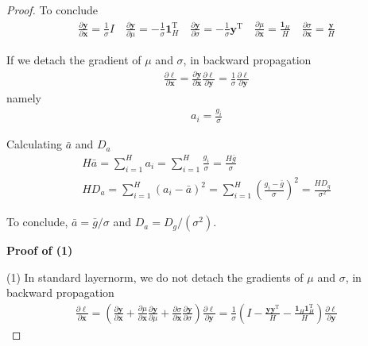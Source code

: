 \documentclass{article}
\newcommand*{\vect}[1]{\textbf{#1}}
\begin{document}
\begin{proof}
To conclude
\begin{equation}\begin{aligned}
\frac{\partial\vect{y}}{\partial\vect{x}} =\frac{1}{\sigma}I \quad
\frac{\partial\vect{y}}{\partial\mu} =-\frac{1}{\sigma}\vect{1}_H^\text{T} \quad
\frac{\partial\vect{y}}{\partial\sigma} =-\frac{1}{\sigma}\vect{y}^\text{T}\quad
\frac{\partial\mu}{\partial\vect{x}}=\frac{\vect{1}_H}{H}\quad \frac{\partial\sigma}{\partial\vect{x}}=\frac{\vect{y}}{H}
\end{aligned}\end{equation}

If we detach the gradient of $\mu$ and $\sigma$, in backward propagation
\begin{equation}\begin{aligned}
\frac{\partial\ell}{\partial\vect{x}}=\frac{\partial\vect{y}}{\partial\vect{x}}\frac{\partial\ell}{\partial\vect{y}}=\frac{1}{\sigma}\frac{\partial\ell}{\partial\vect{y}}
\end{aligned}\end{equation}
namely
\begin{equation}\begin{aligned}
a_i=\frac{g_i}{\sigma}
\end{aligned}\end{equation}

Calculating $\bar a$ and $D_a$
\begin{equation}\begin{aligned}
H\bar a=\sum\limits_{i=1}^Ha_i=\sum\limits_{i=1}^H\frac{g_i}{\sigma}=\frac{H\bar g}{\sigma}\\
HD_a=\sum\limits_{i=1}^H(a_i-\bar a)^2=\sum\limits_{i=1}^H(\frac{g_i-\bar g}{\sigma})^2=\frac{HD_g}{\sigma^2}
\end{aligned}\end{equation}

To conclude, $\bar a=\bar g/\sigma$ and $D_a=D_g/(\sigma^2)$.


\textbf{Proof of (1)}

(1) In standard layernorm, we do not detach the gradients of $\mu$ and $\sigma$, in backward propagation
\begin{equation}\begin{aligned}
\frac{\partial\ell}{\partial\vect{x}}=(\frac{\partial\vect{y}}{\partial\vect{x}}+\frac{\partial\mu}{\partial\vect{x}}\frac{\partial\vect{y}}{\partial\mu}+\frac{\partial\sigma}{\partial\vect{x}}\frac{\partial\vect{y}}{\partial\sigma})\frac{\partial\ell}{\partial\vect{y}}=\frac{1}{\sigma}(I-\frac{\vect{y}\vect{y}^\text{T}}{H}-\frac{\vect{1}_H\vect{1}_H^\text{T}}{H})\frac{\partial\ell}{\partial\vect{y}}
\end{aligned}\end{equation}


\end{proof}
\end{document}
